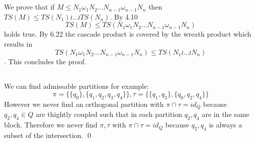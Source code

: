 \documentclass[a4paper,12pt,numbers=noenddot]{scrreport}
\begin{document}

\chapter{}
\section{}
We prove that if $M \leq N_1 \omega_1 N_2 ... N_{n-1}\omega_{n-1} N_n$ then $TS(M) \leq TS(N_1) \wr ... \wr TS(N_n)$.
By 4.10 
$$TS(M) \leq TS(N_1 \omega_1 N_2 ... N_{n-1}\omega_{n-1} N_n)$$ holds true.
By 6.22 the cascade product is covered by the wreath product which results in 
$$TS(N_1 \omega_1 N_2 ... N_{n-1}\omega_{n-1} N_n) \leq TS(N_1 \wr ... \wr N_n)$$.
This concludes the proof.
\section{}
\section{}
\section{}
We can find admissable partitions for example:
$$\pi = \{\{q_0\}, \{q_1, q_2, q_3, q_4\}\}, \tau = \{\{q_1, q_3\}, \{q_0, q_2, q_4\}\}$$
However we never find an orthogonal partition with $\pi \cap \tau = id_Q$ because $q_2, q_4 \in Q$ are thightly coupled such that in each partition $q_2, q_4$ are in the same block.
Therefore we never find $\pi, \tau$ with $\pi \cap \tau = id_Q$ because ${q_2, q_4}$ is always a subset of the intersection.
\qed
\end{document}
